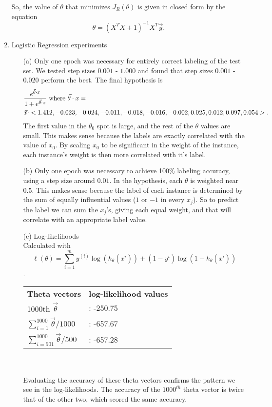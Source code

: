 \documentclass[12pt]{article}
\begin{document}
\begin{enumerate}
  So, the value of $\theta$ that minimizes $J_R(\theta)$ is given in closed form by the equation \[\theta =  (X^TX + 1)^{-1}X^T\vec{y}.\]
  
	\item Logistic Regression experiments
	
	\begin{enumerate}
	\item[(a)] Only one epoch was necessary for entirely correct labeling of the test set. We tested step sizes $0.001$ - $1.000$ and found that step sizes $0.001$ - $0.020$ perform the best. The final hypothesis is
	\begin{align*}
	 &\frac{e^{\vec{\theta} \cdot x}}{1 + e^{\vec{\theta} \cdot x}} \text{ where } \vec{\theta} \cdot x = \\
	  & \small{ \vec{x} \cdot < 1.412, -0.023, -0.024, -0.011, -0.018, -0.016, -0.002, 0.025, 0.012, 0.097, 0.054 >.}
	\end{align*}
	The first value in the $\theta_0$ spot is large, and the rest of the $\theta$ values are small. This makes sense because the labels are exactly correlated with the value of $x_0$. By scaling $x_0$ to be significant in the weight of the instance, each instance's weight is then more correlated with it's label. 
	
	\item[(b)] Only one epoch was necessary to achieve 100\% labeling accuracy, using a step size around $0.01$. In the hypothesis, each $\theta$ is weighted near $0.5$. This makes sense because the label of each instance is determined by the sum of equally influential values ($1$ or $-1$ in every $x_j$). So to predict the label we can sum the $x_j$'s, giving each equal weight, and that will correlate with an appropriate label value.
	
	\item[(c)] Log-likelihoods \\
	Calculated with
	\[ \ell ( \theta ) = \sum_{i=1}^{m} y^{(i)}\log (h_\theta(x^{i})) + (1-y^{i})\log(1 - h_\theta(x^{i}))  \].
	\begin{tabular}{l l}
		\textbf{Theta vectors} & \textbf{log-likelihood values} \\
		1000th $\vec{\theta}$ &: -250.75  \\
		$\sum_{i=1}^{1000} \vec{\theta} / 1000 $ &: -657.67 \\
		$\sum_{i=501}^{1000} \vec{\theta} / 500 $ &: -657.28  \\
	\end{tabular} \\ \\
	Evaluating the accuracy of these theta vectors confirms the pattern we see in the log-likelihoods. The accuracy of the $1000^{th}$ theta vector is twice that of the other two, which scored the same accuracy.
	
	\end{enumerate}
  
\end{enumerate}
\end{document}
